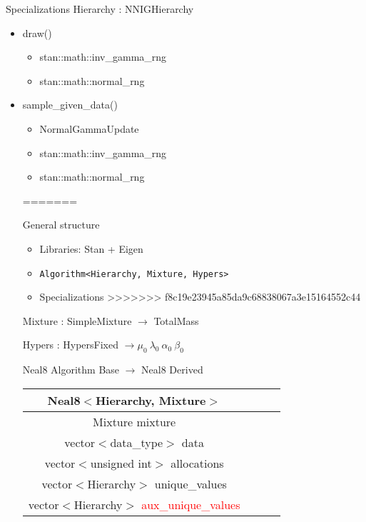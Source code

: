 \begin{frame}{Specializations}
Hierarchy : NNIGHierarchy
	\begin{itemize}
		\item draw()
		\begin{itemize}
			\item stan::math::inv\_gamma\_rng
			\item stan::math::normal\_rng
		\end{itemize}
		\item sample\_given\_data()
		\begin{itemize}
			\item NormalGammaUpdate
			\item stan::math::inv\_gamma\_rng
			\item stan::math::normal\_rng
		\end{itemize}
=======
\begin{frame}{General structure}
\begin{itemize}
		\item Libraries: Stan + Eigen
		\item \texttt{Algorithm<Hierarchy, Mixture, Hypers>}
		\item Specializations
>>>>>>> f8c19e23945a85da9c68838067a3e15164552c44
	\end{itemize}
Mixture : SimpleMixture $ \rightarrow$ TotalMass

Hypers : HypersFixed $ \rightarrow \mu_0 \ \lambda_0 \ \alpha_0 \ \beta_0 $

\end{frame}

\begin{frame}{Neal8}
 Algorithm Base $\rightarrow$ Neal8 Derived

\begin{center}
\begin{tabular}{ |c|c|c|c| } 
\hline
 Neal8$<$Hierarchy, Mixture$>$ \\
\hline
 Mixture mixture\\
 vector$<$data\_type$>$ data  \\ 
 vector$<$unsigned int$>$ allocations  \\
 vector$<$Hierarchy$>$ unique\_values \\
 vector$<$Hierarchy$>$ \textcolor{red}{aux\_unique\_values} \\
\hline
\end{tabular}
\end{center}

\end{frame}


\end{itemize}
\end{frame}
